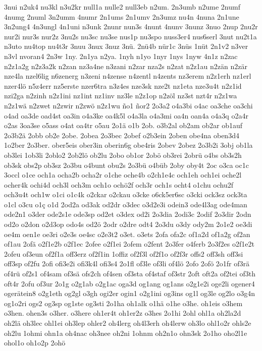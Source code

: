 {3nui
n2uk4
nu3kl
n3u2kr
null1a
nulle2
null3eb
n2um.
2n3umb
n2ume
2numf
4numg
2numl
3n2umm
4numr
2n1ums
2n1umv
2n3umz
nu4n
4nuna
2n1une
3n2ung4
4n3ungl
4n1uni
n3unk
2nunr
nun3s
4nunt
4nunv
3nunz
3nuo
2nup
2nu2r
nur2i
nur3s
nur2z
3nu2s
nu3sc
nu3se
nus1p
nu3spo
nuss3er4
nus6serl
3nut
nu2t1a
n3uto
nu4top
nu4t3r
3nuu
3nux
3nuz
3nü.
2nü4b
nür1c
3nüs
1nüt
2n1v2
n3ver
n3vl
nvoran4
2n3w
1ny.
2n1ya
n2ya.
1nyh
n1yo
1nyr
1nys
1nyw
4n1z
n2zac
n2z1a2g
n2z3a2k
n2zan
nz3a4ne
n3zani
n2zar
nza2s
n2zat
n2z1au
n2zän
n2zär
nze4la
nzel6lig
n6zenerg
n3zeni
n4zense
n4zentl
n4zents
nz3erem
n2z1erh
nz1erl
nzer4lö
n5z4err
nz5erste
nzer6tra
n3z4es
nze3sk
nze2t
nz1eta
nze3u4t
n2z1id
nzi2ga
n2zinh
n2z1ini
nz1int
nz1inv
nz3le
n2z1op
n2zöl
nz3st
nzt4r
n2z1wa
n2z1wä
n2zwet
n2zwir
n2zwö
n2z1wu
ño1
ñor2
2o3a2
o4a3bi
o4ac
oa3che
oa3chi
o4ad
oa3de
oad4st
oa3in
o4a3ke
oa4k5l
o4a3la
o4a3mi
oa4n
oan4a
o4a3q
o2a4r
o2as
3oa3se
o5ass
o4at
oa4tr
o5au
2o1ä
o1b
2ob.
o3b2al
ob2am
ob2ar
ob1auf
2o3b2ä
2obb
ob2e
2obe.
2obea
2o3bec
2obef
o2b3ein
2oben
obe4na
oben3d4
1o2ber
2o3ber.
ober5eis
ober3in
oberin6g
obe4ris
2obev
2obez
2o3b2i
3obj
ob1la
ob3lei
1ob3li
2oblo2
2ob2lö
ob2lu
2obo
ob1or
2obö
ob3rei
2obrü
o4bs
ob3s2h
ob3sk
obs2p
ob3sz
2o3bu
o4bunt
obu2s
2o3bü
o4büb
2oby
oby4t
2oc
o3ca
oc1c
3occl
o1ce
och1a
ocha2b
ocha2r
o1che
oche4b
o2ch1e4c
och1eh
och1ei
oche2l
ocher4k
ochi4d
och3l
och3m
och1o
ochö2f
och3r
och1s
ocht4
o1chu
ochu2f
och3u4t
och1w
o1ci
o1c4k
o2ckar
o2ckau
o3cke
o6ck5er6sc
o3cki
ock3sz
ock3ta
o1cl
o3cu
o1ç
o1d
2od2a
od3ak
od2dr
o3dec
o3d2e3i
odein3
ode4l3ag
ode4man
ode2n1
o3der
ode2s1e
ode3sp
od2et
o3dex
od2i
2o3dia
2odi3c
2odif
2o3dir
2odn
od2o
o2don
o2d3op
odo4s
od2ö
2odr
o2dre
odt4
2o3du
o3dy
ody2m
2o1e2
oe3di
oe4m
oen1e
oe3ri
o2e3s
oe4sc
o2e3t2
o3et.
o3ets
2ofa
ofa2c
of1a2d
of1a2g
of2an
of1au
2ofä
o2f1e2b
o2f1ec
2ofee
o2f1ei
2ofem
o2fent
2o3fer
o4ferb
2o3f2es
o2f1e2t
2ofeu
of3eun
of2f1a
off3erz
of2f1in
1offiz
of2f3l
of2f1o
of2f3r
offs2
off3sh
off3si
off3sp
of2fu
2ofi
ofi3e2i
ofi3k4l
ofi3s4
2o1fl
of3le
of3li
of4lö
2ofo
2ofö
2o1fr
of3rä
of4rü
of2s1
of4sam
of3sä
ofs2ch
of4sen
of3sta
of4staf
of3str
2oft
oft2a
of2tei
of3th
oft4r
2ofu
of3ur
2o1g
o2g1ab
o2g1ac
oga3d
og1ang
og1ans
o2g1e2i
oge2li
ogener4
ogerätein8
o2g1eth
og2gl
o3gh
ogi2er
ogin1
o2g1ini
og3ins
og1l
og3le
og2lo
o3g4n
og1o2ri
ogs2
og3sp
og1ste
og3sti
2o1ha
oh1alk
o1hä
o1he
o3he.
oh1eis
o3hem
o3hen.
ohen3s
o3her.
o3here
oh1er4t
oh1er2z
o3hes
2o1hi
2ohl
ohl1a
oh2la2d
oh2lä
oh3lec
ohl1ei
oh3lep
ohler2
oh4lerg
oh4l3erh
oh4lerw
oh3lo
ohl1o2r
ohls2e
oh2lu
1ohmi
ohn1a
oh4nac
oh3nee
oh2ni
1ohnm
oh2n1o
ohn3sk
2o1ho
oho2l1e
ohol1o
oh1o2p
2ohö
}
